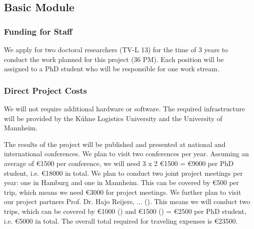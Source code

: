  \subsection{Basic Module}

\subsubsection{Funding for Staff}
\label{sec:staff}

We apply for two doctoral researchers (TV-L 13) for the time of 3 years to conduct the work planned for this project (36 PM). Each position will be assigned to a PhD student who will be responsible for one work stream.

\begin{funds}
\end{funds}

\subsubsection{Direct Project Costs}


We will not require additional hardware or software. The required infrastructure will be provided by the K\"uhne Logistics University and the University of Mannheim.

\label{sec:costs:travel}
The results of the project will be published and presented at national and international conferences. We plan to visit two conferences per year. Assuming an average of \euro1500 per conference, we will need 3 x 2 \euro1500 = \euro9000 per PhD student, i.e. \euro18000 in total. We plan to conduct two joint project meetings per year: one in Hamburg and one in Mannheim. This can be covered by \euro500 per trip, which means we need \euro3000 for project meetings. We further plan to visit our project partners Prof. Dr. Hajo Reijers, ... (). This means we will conduct two trips, which can be covered by \euro1000 () and \euro1500 () = \euro2500 per PhD student, i.e. \euro5000 in total. The overall total required for traveling expenses is \euro23500. 

\begin{funds}
\end{funds}


